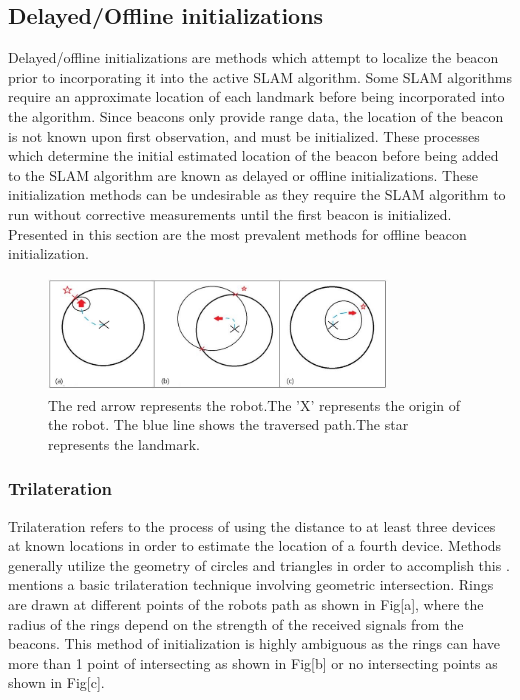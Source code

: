 \documentclass[conference]{IEEEtran}
\begin{document}
		\subsection{Delayed/Offline initializations}
			Delayed/offline initializations are methods which attempt to localize the beacon prior to incorporating it into the active SLAM algorithm. Some SLAM algorithms require an approximate location of each landmark before being incorporated into the algorithm. Since beacons only provide range data, the location of the beacon is not known upon first observation, and must be initialized. These processes which determine the initial estimated location of the beacon before being added to the SLAM algorithm are known as delayed or offline initializations. These initialization methods can be undesirable as they require the SLAM algorithm to run without corrective measurements until the first beacon is initialized. Presented in this section are the most prevalent methods for offline beacon initialization.
			 
			\begin{figure}
				\centering
				\includegraphics[height=30mm,width=90mm]{Trilateration_methods.JPG}
				\caption{The red arrow represents the robot.The 'X' represents the origin of the robot. The blue line shows the traversed path.The star represents the landmark. }
			\end{figure}
		
			\subsubsection{Trilateration}
				Trilateration refers to the process of using the distance to at least three devices at known locations in order to estimate the location of a fourth device. Methods generally utilize the geometry of circles and triangles in order to accomplish this \cite{Johnson2017}. \cite{Thrun2002} mentions a basic trilateration technique involving geometric intersection. Rings are drawn at different points of the robots path as shown in Fig[a], where the radius of the rings depend on the strength of the received signals from the beacons. This method of initialization is highly ambiguous as the rings can have more than 1 point of intersecting as shown in Fig[b]  or no  intersecting points as shown in Fig[c]. %
		
\end{document}
